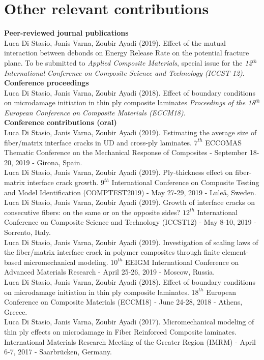 \section*{Other relevant contributions}
\textbf{Peer-reviewed journal publications}\\[10pt]
Luca Di Stasio, Janis Varna, Zoubir Ayadi (2019). Effect of the mutual interaction between debonds on Energy Release Rate on the potential fracture plane. To be submitted to \textit{Applied Composite Materials}, special issue for the \textit{12$^{th}$ International Conference on Composite Science and Technology (ICCST 12)}.\\[12.5pt]
\textbf{Conference proceedings}\\[10pt]
Luca Di Stasio, Janis Varna, Zoubir Ayadi (2018). Effect of boundary conditions on microdamage initiation in thin ply composite laminates \textit{Proceedings of the 18$^{th}$ European Conference on Composite Materials (ECCM18)}.\\[12.5pt]
\textbf{Conference contributions (oral)}\\[10pt]
Luca Di Stasio, Janis Varna, Zoubir Ayadi (2019). Estimating the average size of fiber/matrix interface cracks in UD and cross-ply laminates. $7^{th}$ ECCOMAS Thematic Conference on the Mechanical Response of Composites - September 18-20, 2019 - Girona, Spain.\\[10pt]
Luca Di Stasio, Janis Varna, Zoubir Ayadi (2019). Ply-thickness effect on fiber-matrix interface crack growth. $9^{th}$ International Conference on Composite Testing and Model Identification (COMPTEST2019) - May 27-29, 2019 - Lule\aa, Sweden.\\[10pt]
Luca Di Stasio, Janis Varna, Zoubir Ayadi (2019). Growth of interface cracks on consecutive fibers: on the same or on the opposite sides? $12^{th}$ International Conference on Composite Science and Technology (ICCST12) - May 8-10, 2019 - Sorrento, Italy.\\[10pt]
Luca Di Stasio, Janis Varna, Zoubir Ayadi (2019). Investigation of scaling laws of the fiber/matrix interface crack in polymer composites through finite element-based micromechanical modeling. $10^{th}$ EEIGM International Conference on Advanced Materials Research - April 25-26, 2019 - Moscow, Russia.\\[10pt]
Luca Di Stasio, Janis Varna, Zoubir Ayadi (2018). Effect of boundary conditions on microdamage initiation in thin ply composite laminates. $18^{th}$ European Conference on Composite Materials (ECCM18) - June 24-28, 2018 - Athens, Greece.\\[10pt]
Luca Di Stasio, Janis Varna, Zoubir Ayadi (2017). Micromechanical modeling of thin ply effects on microdamage in Fiber Reinforced Composite laminates. International Materials Research Meeting of the Greater Region (IMRM) - April 6-7, 2017 - Saarbr\"ucken, Germany.
